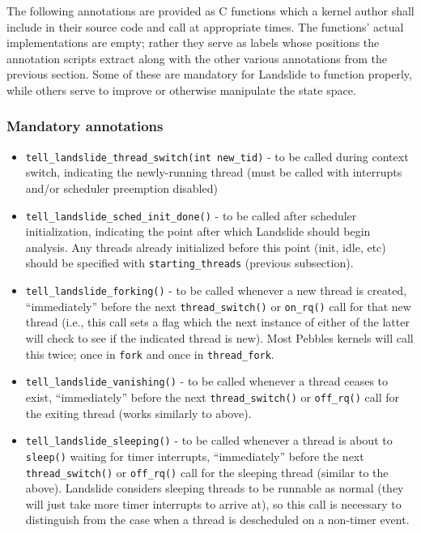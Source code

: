 The following annotations are provided as C functions
which a kernel author shall include in their source code and call at appropriate times.
The functions' actual implementations are empty;
rather they serve as labels whose positions the annotation scripts extract
along with the other various annotations from the previous section.
Some of these are mandatory for Landslide to function properly,
while others serve to improve or otherwise manipulate the state space.

\subsubsection{Mandatory annotations}

\begin{itemize}
\item {\tt tell\_landslide\_thread\_switch(int new\_tid)} - to be called during context switch, indicating the newly-running thread
	(must be called with interrupts and/or scheduler preemption disabled)
\item {\tt tell\_landslide\_sched\_init\_done()} - to be called after scheduler initialization,
	indicating the point after which Landslide should begin analysis.
	Any threads already initialized before this point (init, idle, etc) should be specified with {\tt starting\_threads} (previous subsection).
\item {\tt tell\_landslide\_forking()} - to be called whenever a new thread is created,
	``immediately'' before the next {\tt thread\_switch()} or {\tt on\_rq()} call for that new thread (i.e., this call sets a flag which the next instance of either of the latter will check to see if the indicated thread is new).
	Most Pebbles kernels will call this twice; once in {\tt fork} and once in {\tt thread\_fork}.
\item {\tt tell\_landslide\_vanishing()} - to be called whenever a thread ceases to exist,
	``immediately'' before the next {\tt thread\_switch()} or {\tt off\_rq()} call for the exiting thread
	(works similarly to above).
\item {\tt tell\_landslide\_sleeping()} - to be called whenever a thread is about to {\tt sleep()} waiting for timer interrupts,
	``immediately'' before the next {\tt thread\_switch()} or {\tt off\_rq()} call for the sleeping thread
	(similar to the above).
	Landslide considers sleeping threads to be runnable as normal (they will just take more timer interrupts to arrive at),
	so this call is necessary to distinguish from the case when a thread is descheduled on a non-timer event.

\end{itemize}
